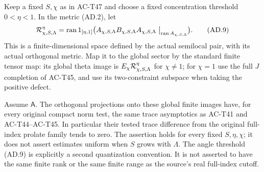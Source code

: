 \begin{theorem}
\label{AC-T48}
Keep a fixed \(S,\chi\) as in AC-T47 and choose
a fixed concentration threshold \(0<\eta<1\).
In the metric (AD.2), let
\[
 {\cal R}_{\chi,S,\Lambda}^{\eta}
  =\operatorname{ran}
       1_{[\eta,1]}
        \bigl(A_{\chi,S,\Lambda}B_{\chi,S,\Lambda}
                         A_{\chi,S,\Lambda}
               \bigm|_{\operatorname{ran}A_{\chi,S,\Lambda}}\bigr).
 \tag{AD.9}
\]
This is a finite-dimensional space defined by the
actual semilocal pair, with its actual orthogonal
metric.  Map it to the global sector by the standard
finite tensor map: its global theta image is
\(E_\chi{\cal R}_{\chi,S,\Lambda}^{\eta}\) for
\(\chi\ne1\); for \(\chi=1\) use the full \(J\)
completion of AC-T45, and use its two-constraint
subspace when taking the positive defect.

Assume \(\mathsf A\).  The orthogonal projections
onto these global finite images have, for every
original compact norm test, the same trace
asymptotics as AC-T41 and AC-T44--AC-T45.
In particular their tested trace difference from
the original full-index prolate family tends to zero.
The assertion holds for every fixed \(S,\eta,\chi\);
it does not assert estimates uniform when \(S\)
grows with \(\Lambda\).
The angle threshold (AD.9) is explicitly a second
quantization convention.  It is not asserted to
have the same finite rank or the same finite range
as the source's real full-index cutoff.
\end{theorem}
